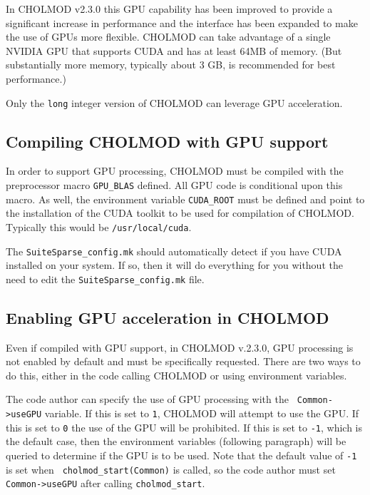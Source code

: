 \documentclass[11pt]{article}
\begin{document}
In CHOLMOD v2.3.0 this GPU capability has been improved to provide a
significant increase in performance and the interface has been expanded to make
the use of GPUs more flexible.  CHOLMOD can take advantage of a single NVIDIA
GPU that supports CUDA and has at least 64MB of memory.  (But substantially
more memory, typically about 3 GB, is recommended for best performance.)

Only the {\tt long} integer version of CHOLMOD can leverage GPU acceleration.

\subsection{Compiling CHOLMOD with GPU support}

In order to support GPU processing, CHOLMOD must be compiled with the
preprocessor macro {\tt GPU\_BLAS} defined.  All GPU code is conditional upon
this macro.  As well, the environment variable {\tt CUDA\_ROOT} must be defined
and point to the installation of the CUDA toolkit to be used for compilation of
CHOLMOD.  Typically this would be {\tt /usr/local/cuda}.

The {\tt SuiteSparse\_config.mk} should automatically detect if you have
CUDA installed on your system.  If so, then it will do everything for you
without the need to edit the {\tt SuiteSparse\_config.mk} file.

\subsection{Enabling GPU acceleration in CHOLMOD}

Even if compiled with GPU support, in CHOLMOD v.2.3.0, GPU processing is not
enabled by default and must be specifically requested.  There are two ways to
do this, either in the code calling CHOLMOD or using environment variables.

The code author can specify the use of GPU processing with the {\tt
Common->useGPU} variable.  If this is set to {\tt 1}, CHOLMOD will attempt to
use the GPU.  If this is set to {\tt 0} the use of the GPU will be prohibited.
If this is set to {\tt -1}, which is the default case, then the environment
variables (following paragraph) will be queried to determine if the GPU is to
be used.  Note that the default value of {\tt -1} is set when {\tt
cholmod\_start(Common)} is called, so the code author must set {\tt
Common->useGPU} after calling {\tt cholmod\_start}.
\end{document}
